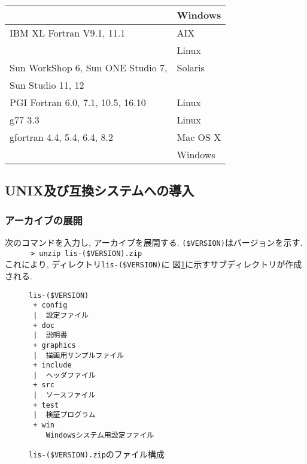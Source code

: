 \documentclass[a4paper]{jarticle}
\begin{document}
\begin{table}[htbp]
\begin{center}
{\begin{tabular}{l|l}
                                                  & Windows  \\
\hline
IBM XL Fortran V9.1, 11.1                  & AIX     \\
                                           & Linux   \\
\hline
Sun WorkShop 6, Sun ONE Studio 7,          & Solaris \\
Sun Studio 11, 12                          &         \\
\hline
PGI Fortran 6.0, 7.1, 10.5, 16.10          & Linux \\
\hline
g77 3.3                                    & Linux \\
gfortran 4.4, 5.4, 6.4, 8.2                & Mac OS X \\
                                           & Windows \\
\hline
\end{tabular}
}
\end{center}
\end{table} 

\subsection{UNIX及び互換システムへの導入}
\subsubsection{アーカイブの展開}
次のコマンドを入力し, アーカイブを展開する. \verb|($VERSION)|はバージョンを示す. \\
\verb&      > unzip lis-($VERSION).zip &\\
これにより, ディレクトリ{\tt lis-(\$VERSION)}に
図\ref{listargz}に示すサブディレクトリが作成される. 

\begin{figure}[htbp]
\begin{center}
\begin{verbatim}
lis-($VERSION)
 + config
 |  設定ファイル
 + doc
 |  説明書
 + graphics
 |  描画用サンプルファイル
 + include
 |  ヘッダファイル
 + src
 |  ソースファイル
 + test
 |  検証プログラム
 + win
    Windowsシステム用設定ファイル
\end{verbatim}
\end{center}
\caption{{\tt lis-(\$VERSION).zip}のファイル構成}
\label{listargz}
\end{figure}
\end{document}
